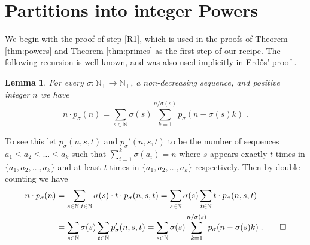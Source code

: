 \documentclass[11pt]{article}
\makeatletter
\theoremstyle{plain}
\newtheorem{lemma}[theorem]{Lemma}
\renewenvironment{proof}[1][\proofname]
{\par\pushQED{\qed}
	\normalfont\topsep6\p@\@plus6\p@\relax\trivlist
	\item[\hskip\labelsep\bfseries#1\@addpunct{.}]
	\ignorespaces}
{\popQED\endtrivlist\@endpefalse}
\makeatother
\begin{document}
\section{Partitions into integer Powers}\label{sec:proofpowers}

We begin with the proof of step \ref{R1}, which is used in the proofs of Theorem \ref{thm:powers} and Theorem \ref{thm:primes} as the first step of our recipe.
The following recursion is well known, and was also used implicitly in Erd\H{o}s' proof \cite{Erdos}.

\begin{lemma}\label{lem:recursion}
For every $\sigma\colon \mathbb{N}_+\to \mathbb{N}_+$, a non-decreasing sequence, and positive integer $n$ we have
\begin{equation*}
    n\cdot p_{\sigma}(n)= \sum_{s\in \mathbb{N}} \sigma(s)\sum _{k=1}^{n/\sigma(s)} p_{\sigma}(n-\sigma(s)k)\;.
\end{equation*}
\end{lemma}


\begin{proof}
To see this let $p_{\sigma}(n,s,t)$ and $p_{\sigma}'(n,s,t)$ to be the number of sequences $a_1\leq a_2\leq \ldots \leq a_k$ such that $\sum_{i=1}^{k}\sigma(a_i)=n$ where $s$ appears exactly $t$ times in $\{a_1,a_2,\ldots ,a_k\}$ and at least $t$ times in $\{a_1,a_2,\ldots ,a_k\}$ respectively.
Then by double counting we have
\begin{align*}
    n\cdot p_\sigma(n)&=\sum_{s\in \mathbb{N}, t\in \mathbb {N}} \sigma(s)\cdot t \cdot p_\sigma(n,s,t)=\sum _{s\in \mathbb{N}}\sigma(s)\sum_{t\in \mathbb {N}}t\cdot p_\sigma(n,s,t)\\
    &=\sum _{s\in \mathbb{N}}\sigma(s)\sum_{t\in \mathbb {N}}p_\sigma'(n,s,t)=\sum _{s\in \mathbb{N}}\sigma(s)\sum _{k=1}^{n/\sigma(s)}p_\sigma(n-\sigma(s)k)\;.\qedhere
\end{align*}
\end{proof}
\end{document}
